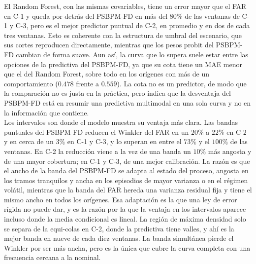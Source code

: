 El Random Forest, con las mismas covariables, tiene un error mayor que el FAR en C-1 y queda por detrás del PSBPM-FD en más del $80\%$ de las ventanas de C-1 y C-3, pero es el mejor predictor puntual de C-2, en promedio y en dos de cada tres ventanas. Esto es coherente con la estructura de umbral del escenario, que sus cortes reproducen directamente, mientras que los pesos probit del PSBPM-FD cambian de forma suave. Aun así, la curva que lo supera suele estar entre las opciones de la predictiva del PSBPM-FD, ya que su cota tiene un MAE menor que el del Random Forest, sobre todo en los orígenes con más de un comportamiento ($0.478$ frente a $0.559$). La cota no es un predictor, de modo que la comparación no es justa en la práctica, pero indica que la desventaja del PSBPM-FD está en resumir una predictiva multimodal en una sola curva y no en la información que contiene.\\

Los intervalos son donde el modelo muestra su ventaja más clara. Las bandas puntuales del PSBPM-FD reducen el Winkler del FAR en un $20\%$ a $22\%$ en C-2 y en cerca de un $3\%$ en C-1 y C-3, y lo superan en entre el $73\%$ y el $100\%$ de las ventanas. En C-2 la reducción viene a la vez de una banda un $10\%$ más angosta y de una mayor cobertura; en C-1 y C-3, de una mejor calibración. La razón es que el ancho de la banda del PSBPM-FD se adapta al estado del proceso, angosta en los tramos tranquilos y ancha en los episodios de mayor varianza o en el régimen volátil, mientras que la banda del FAR hereda una varianza residual fija y tiene el mismo ancho en todos los orígenes. Esa adaptación es la que una ley de error rígida no puede dar, y es la razón por la que la ventaja en los intervalos aparece incluso donde la media condicional es lineal. La región de máxima densidad solo se separa de la equi-colas en C-2, donde la predictiva tiene valles, y ahí es la mejor banda en nueve de cada diez ventanas. La banda simultánea pierde el Winkler por ser más ancha, pero es la única que cubre la curva completa con una frecuencia cercana a la nominal.\\

